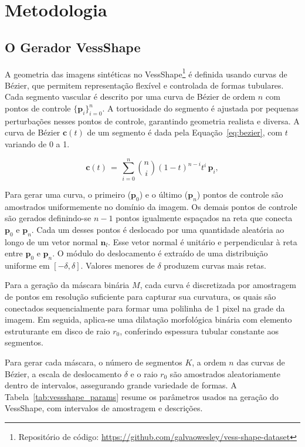 \documentclass[%
reprint,
nofootinbib,
 amsmath,amssymb,
aps,
floatfix,
superscriptaddress,
showkeys,
longbibliography
]{revtex4-1}
\begin{document}
\section{Metodologia}
\label{s:methodology}

\subsection{O Gerador VessShape}

A geometria das imagens sintéticas no VessShape\footnote{{Repositório de código}: \url{https://github.com/galvaowesley/vess-shape-dataset}} é definida usando curvas de Bézier, que permitem representação flexível e controlada de formas tubulares. Cada segmento vascular é descrito por uma curva de Bézier de ordem $n$ com pontos de controle $\{\mathbf{p}_i\}_{i=0}^n$. A tortuosidade do segmento é ajustada por pequenas perturbações nesses pontos de controle, garantindo geometria realista e diversa. A curva de Bézier $\mathbf{c}(t)$ de um segmento é dada pela Equação~\ref{eq:bezier}, com $t$ variando de 0 a 1.

\begin{equation}
\mathbf{c}(t) \,=\, \sum_{i=0}^{n} \binom{n}{i} (1-t)^{n-i} t^{i} \, \mathbf{p}_i,
\label{eq:bezier}
\end{equation}

Para gerar uma curva, o primeiro ($\mathbf{p}_0$) e o último ($\mathbf{p}_n$) pontos de controle são amostrados uniformemente no domínio da imagem. Os demais pontos de controle são gerados definindo-se $n-1$ pontos igualmente espaçados na reta que conecta $\mathbf{p}_0$ e $\mathbf{p}_n$. Cada um desses pontos é deslocado por uma quantidade aleatória ao longo de um vetor normal $\mathbf{n}_l$. Esse vetor normal é unitário e perpendicular à reta entre $\mathbf{p}_0$ e $\mathbf{p}_n$. O módulo do deslocamento é extraído de uma distribuição uniforme em $[-\delta,\delta]$. Valores menores de $\delta$ produzem curvas mais retas.

Para a geração da máscara binária $M$, cada curva é discretizada por amostragem de pontos em resolução suficiente para capturar sua curvatura, os quais são conectados sequencialmente para formar uma polilinha de 1 pixel na grade da imagem. Em seguida, aplica-se uma dilatação morfológica binária com elemento estruturante em disco de raio $r_0$, conferindo espessura tubular constante aos segmentos. 

Para gerar cada máscara, o número de segmentos $K$, a ordem $n$ das curvas de Bézier, a escala de deslocamento $\delta$ e o raio $r_0$ são amostrados aleatoriamente dentro de intervalos, assegurando grande variedade de formas. A Tabela~\ref{tab:vessshape_params} resume os parâmetros usados na geração do VessShape, com intervalos de amostragem e descrições.
\end{document}
